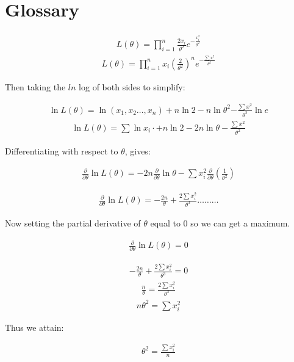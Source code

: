 \documentclass{article}
\begin{document}
\section{Glossary}\label{glossary}

\begin{align}
    L(\theta) = \prod_{i=1}^n\frac{2x_{i}}{\theta^2}e^{-\frac{x_{i}^2}{\theta^2}}
\end{align}
\begin{align}
    L(\theta) = \prod_{i=1}^n x_{i}(\frac{2}{\theta^2})^n e^{-\frac{\sum{x^2}}{\theta^2}}
\end{align}

Then taking the $ln$ log of both sides to simplify:

\begin{align}
    \ln{L(\theta)}= \ln{(x_{1},x_{2}\dots,x_{n})} + n\ln{2} - n\ln\theta^2 {-\frac{\sum{x^2}}{\theta^2}}\ln{e}
\end{align}
\begin{align}
    \ln{L(\theta)}= \sum\ln{x_{i}} \cdot + n\ln{2} - 2n\ln{\theta} -\frac{\sum{x^2}}{\theta^2}
\end{align}

Differentiating with respect to $\theta$, gives:

\begin{align}
    \frac{\partial }{\partial \theta}\ln L{(\theta)} = -2n\frac{\partial}{\partial\theta}\ln\theta - \sum x_{i}^2\frac{\partial}{\partial\theta}(\frac{1}{\theta^2})
\end{align}

\begin{align}
    \frac{\partial }{\partial \theta}\ln L{(\theta)} = -\frac{2n}{\theta} + \frac{2\sum x_{i}^2}{\theta^3} \dots \dots \dots
\end{align}

Now setting the partial derivative of $\theta$ equal to $0$ so we can get a maximum.

\begin{align}
    \frac{\partial }{\partial \theta}\ln L{(\theta)} = 0
\end{align}

\begin{align}
    -\frac{2n}{\theta} + \frac{2\sum x_{i}^2}{\theta^3} = 0
\end{align}
\begin{align}
    \frac{n}{\theta} = \frac{2\sum x_{i}^2}{\theta^3}
\end{align}
\begin{align}
  n\theta^2= \sum x_{i}^2
\end{align}

Thus we attain:

\begin{align}
    \theta^2 = \frac{\sum x_{i}^2}{n}
\end{align}





\end{document}
